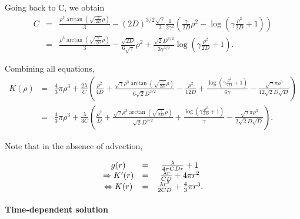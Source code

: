 \documentclass[english]{article}
\begin{document}
Going back to C, we obtain
\begin{equation}
\begin{array}{ccc}
C & = & \frac{\rho^{3}\arctan(\sqrt{\frac{\gamma}{2D}}\rho)}{3}-\left(2D\right)^{3/2}\frac{\sqrt{\gamma}}{3}\frac{1}{2\gamma^{2}}\left(\frac{\gamma}{2D}\rho^{2}-\log(\gamma\frac{\rho^{2}}{2D}+1)\right)\\
 & = & \frac{\rho^{3}\arctan(\sqrt{\frac{\gamma}{2D}}\rho)}{3}-\frac{\sqrt{2D}}{6\sqrt{\gamma}}\rho^{2}+\frac{\sqrt{2}D^{3/2}}{3\gamma^{3/2}}\log(\gamma\frac{\rho^{2}}{2D}+1).
\end{array}
\end{equation}

Combining all equations,
\begin{equation}
\begin{array}{ccc}
K(\rho) & = & \frac{4}{3}\pi\rho^{3}+\frac{2\lambda}{C}\left(\frac{\rho^{2}}{4D}+\frac{\sqrt{\gamma}\rho^{3}\arctan(\sqrt{\frac{\gamma}{2D}}\rho)}{6\sqrt{2}D^{3/2}}-\frac{\rho^{2}}{12D}+\frac{\log\left(\gamma\frac{\rho^{2}}{2D}+1\right)}{6\gamma}-\frac{\sqrt{\gamma}\pi\rho^{3}}{12\sqrt{2}D\sqrt{D}}\right)\\
 & = & \frac{4}{3}\pi\rho^{3}+\frac{\lambda}{3C}\left(\frac{\rho^{2}}{D}+\frac{\sqrt{\gamma}\rho^{3}\arctan(\sqrt{\frac{\gamma}{2D}}\rho)}{\sqrt{2}D^{3/2}}+\frac{\log\left(\gamma\frac{\rho^{2}}{2D}+1\right)}{\gamma}-\frac{\sqrt{\gamma}\pi\rho^{3}}{2\sqrt{2}D\sqrt{D}}\right).
\end{array}\label{eq:K_intra_adv_app}
\end{equation}

Note that in the absence of advection,

\begin{equation}
\begin{array}{ccc}
g(r) & = & \frac{\lambda}{4\pi CDr}+1\\
\Rightarrow K'(r) & = & \frac{\lambda r}{CD}+4\text{\ensuremath{\pi r^{2}}}\\
\Leftrightarrow K(r) & = & \frac{\lambda r^{2}}{2CD}+\frac{4}{3}\pi r^{3}.
\end{array}\label{eq:K_intra_no_adv_steady_app}
\end{equation}


\paragraph{Time-dependent solution}
\end{document}
